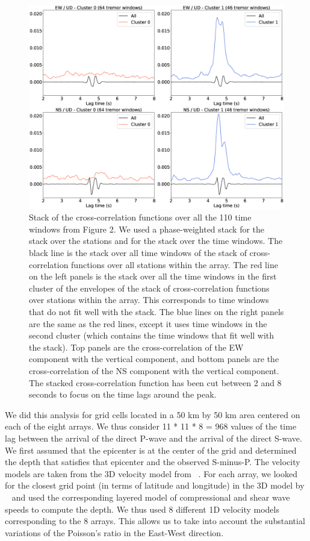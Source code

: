 \documentclass[draft]{agujournal2019}
\begin{document}
\begin{figure}
\noindent\includegraphics[width=\textwidth, trim={0cm 0cm 0cm 0cm},clip]{figures/BS_-05_-05_PWS_PWS_cluster_stackcc.eps}
\caption{Stack of the cross-correlation functions over all the 110 time windows from Figure 2. We used a phase-weighted stack for the stack over the stations and for the stack over the time windows. The black line is the stack over all time windows of the stack of cross-correlation functions over all stations within the array. The red line on the left panels is the stack over all the time windows in the first cluster of the envelopes of the stack of cross-correlation functions over stations within the array.  This corresponds to time windows that do not fit well with the stack. The blue lines on the right panels are the same as the red lines, except it uses time windows in the second cluster (which contains the time windows that fit well with the stack). Top panels are the cross-correlation of the EW component with the vertical component, and bottom panels are the cross-correlation of the NS component with the vertical component. The stacked cross-correlation function has been cut between 2 and 8 seconds to focus on the time lags around the peak.}
\label{pngfiguresample}
\end{figure}

We did this analysis for grid cells located in a 50 km by 50 km area centered on each of the eight arrays. We thus consider 11 * 11 * 8 = 968 values of the time lag between the arrival of the direct P-wave and the arrival of the direct S-wave. We first assumed that the epicenter is at the center of the grid and determined the depth that satisfies that epicenter and the observed S-minus-P. The velocity models are taken from the 3D velocity model from ~. For each array, we looked for the closest grid point (in terms of latitude and longitude) in the 3D model by ~ and used the corresponding layered model of compressional and shear wave speeds to compute the depth. We thus used 8 different 1D velocity models corresponding to the 8 arrays. This allows us to take into account the substantial variations of the Poisson's ratio in the East-West direction.
\end{document}
